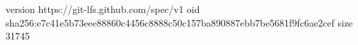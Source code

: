 version https://git-lfs.github.com/spec/v1
oid sha256:e7c41e5b73eee88860c4456c8888c50c157ba890887ebb7be5681f9fc6ae2cef
size 31745
